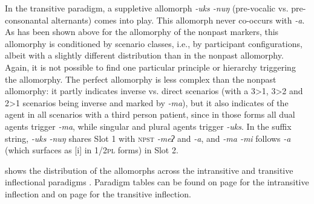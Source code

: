 In the transitive paradigm, a suppletive allomorph \emph{-uks \ti -nuŋ} (pre-vocalic vs. pre-consonantal alternants) comes into play. This allomorph never co-occurs with \emph{-a}. As has been shown above for the allomorphy of the nonpast markers, this allomorphy is conditioned by scenario classes, i.e., by participant configurations, albeit with a slightly different distribution than in the nonpast allomorphy. Again, it is  not possible to find one particular  principle or hierarchy triggering the allomorphy. The perfect allomorphy is less complex than the nonpast allomorphy: it partly indicates inverse vs. direct scenarios (with a 3>1, 3>2 and 2>1 scenarios being inverse and marked by \emph{-ma}), but it also indicates  of the agent in all scenarios with a third person patient, since in those forms all dual agents trigger \emph{-ma}, while singular and plural agents trigger \emph{-uks}. In the suffix string, \emph{-uks \ti -nuŋ} shares Slot 1 with {\scshape npst} \emph{-meʔ} and   \emph{-a}, and \emph{-ma \ti -mi} follows  \emph{-a} (which surfaces as [i] in {\scshape  1/2pl} forms)  in Slot 2.

 shows the distribution of the allomorphs across the intransitive and transitive inflectional paradigms%
.  Paradigm tables can be found on page \pageref{par-apma-pst} for the intransitive inflection and on page \pageref{par-chimd-prf} for the transitive inflection. 

